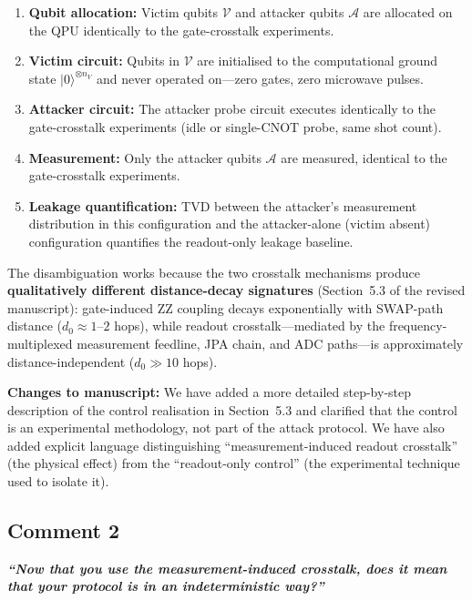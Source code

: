 \documentclass[11pt,a4paper]{article}
\begin{document}
\begin{enumerate}[leftmargin=*]
    \item \textbf{Qubit allocation:} Victim qubits $\mathcal{V}$ and attacker qubits
    $\mathcal{A}$ are allocated on the QPU identically to the gate-crosstalk experiments.
    \item \textbf{Victim circuit:} Qubits in $\mathcal{V}$ are initialised to the
    computational ground state $|0\rangle^{\otimes n_V}$ and never operated on---zero
    gates, zero microwave pulses.
    \item \textbf{Attacker circuit:} The attacker probe circuit executes identically to
    the gate-crosstalk experiments (idle or single-CNOT probe, same shot count).
    \item \textbf{Measurement:} Only the attacker qubits $\mathcal{A}$ are measured,
    identical to the gate-crosstalk experiments.
    \item \textbf{Leakage quantification:} TVD between the attacker's measurement
    distribution in this configuration and the attacker-alone (victim absent)
    configuration quantifies the readout-only leakage baseline.
\end{enumerate}

The disambiguation works because the two crosstalk mechanisms produce
\textbf{qualitatively different distance-decay signatures} (Section~5.3 of the revised
manuscript): gate-induced ZZ coupling decays exponentially with SWAP-path distance
($d_0 \approx 1$--$2$ hops), while readout crosstalk---mediated by the
frequency-multiplexed measurement feedline, JPA chain, and ADC paths---is approximately
distance-independent ($d_0 \gg 10$ hops).

\medskip\noindent\textbf{Changes to manuscript:} We have added a more detailed
step-by-step description of the control realisation in Section~5.3 and clarified that the
control is an experimental methodology, not part of the attack protocol. We have also
added explicit language distinguishing ``measurement-induced readout crosstalk'' (the
physical effect) from the ``readout-only control'' (the experimental technique used to
isolate it).

\subsection*{Comment 2}

\noindent\textbf{\textit{``Now that you use the measurement-induced crosstalk, does it
mean that your protocol is in an indeterministic way?''}}
\end{document}
